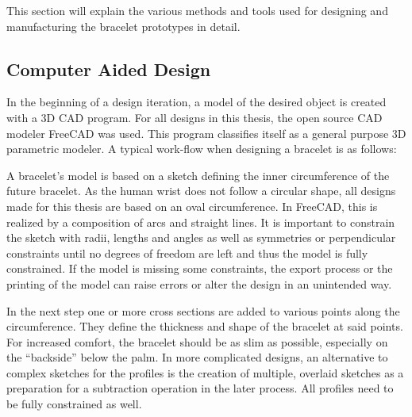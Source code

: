 This section will explain the various methods and tools used for designing and manufacturing the bracelet prototypes in detail.

\subsection{Computer Aided Design}
In the beginning of a design iteration, a model of the desired object is created with a 3D \ac{CAD} program. For all designs in this thesis, the open source \ac{CAD} modeler FreeCAD \cite{freecad} was used. This program classifies itself as a general purpose 3D parametric modeler. A typical work-flow when designing a bracelet is as follows:

A bracelet's model is based on a sketch defining the inner circumference of the future bracelet. As the human wrist does not follow a circular shape, all designs made for this thesis are based on an oval circumference. In FreeCAD, this is realized by a composition of arcs and straight lines. It is important to constrain the sketch with radii, lengths and angles as well as symmetries or perpendicular constraints until no degrees of freedom are left and thus the model is fully constrained. If the model is missing some constraints, the export process or the printing of the model can raise errors or alter the design in an unintended way.

In the next step one or more cross sections are added to various points along the circumference. They define the thickness and shape of the bracelet at said points. For increased comfort, the bracelet should be as slim as possible, especially on the ``backside'' below the palm. In more complicated designs, an alternative to complex sketches for the profiles is the creation of multiple, overlaid sketches as a preparation for a subtraction operation in the later process. All profiles need to be fully constrained as well.

